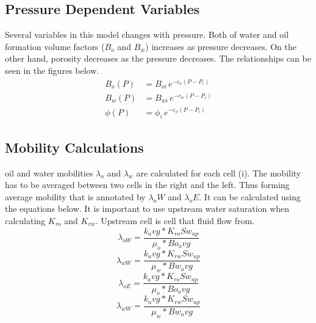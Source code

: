 \documentclass[12pt,letterpaper,titlepage]{article}
\begin{document}
\subsection{Pressure Dependent Variables}
Several variables in this model changes with pressure. Both of water and oil formation volume factors ($B_o$ and $B_w$) increases as pressure decreases. On the other hand, porosity decreases as the pressure decreases. The relationships can be seen in the figures below.
\begin{align}
B_o(P)&=B_{oi}\,e^{-c_o(P-P_i)}\\
B_w(P)&=B_{wi}\,e^{-c_w(P-P_i)}\\
\phi(P)&=\phi_{i}\,e^{-c_\phi(P-P_i)}
\end{align}

\subsection{Mobility Calculations}
oil and water mobilities $\lambda_o$ and $\lambda_w$ are calculated for each cell (i). The mobility has to be averaged between two cells in the right and the left. Thus forming average mobility that is annotated by $\lambda_oW$ and $\lambda_oE$. It can be calculated using the equations below. It is important to use upstream water saturation when calculating $K_{ro}$ and $K_{rw}$. Upstream cell is cell that fluid flow from.
\begin{equation}
\label{moboW}
\lambda_{oW}=\frac{k_avg*K_{ro}Sw_{up}}{\mu_o*Bo_avg}
\end{equation}
\begin{equation}
\label{mobwW}
\lambda_{wW}=\frac{k_avg*K_{rw}Sw_{up}}{\mu_w*Bw_avg}
\end{equation}
\begin{equation}
\label{moboE}
\lambda_{oE}=\frac{k_avg*K_{ro}Sw_{up}}{\mu_o*Bo_avg}
\end{equation}
\begin{equation}
\label{mobwE}
\lambda_{wW}=\frac{k_avg*K_{rw}Sw_{up}}{\mu_w*Bw_avg}
\end{equation}
\end{document}
